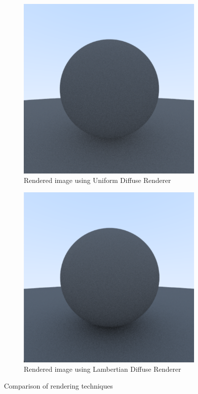 \documentclass[12pt]{article}
\begin{document}
\begin{figure}[H]
    \centering
    \begin{subfigure}[b]{0.45\textwidth}
        \centering
        \includegraphics[width=\textwidth]{images/uniform_diffuse.png}
        \caption{Rendered image using Uniform Diffuse Renderer}
        \label{fig:completely_diffuse}
    \end{subfigure}
    \hfill
    \begin{subfigure}[b]{0.45\textwidth}
        \centering
        \includegraphics[width=\textwidth]{images/lambertian_diffuse.png}
        \caption{Rendered image using Lambertian Diffuse Renderer}
        \label{fig:lambertian_diffuse}
    \end{subfigure}
    \caption{Comparison of rendering techniques}
    \label{fig:rendering_comparison}
\end{figure}
\end{document}
